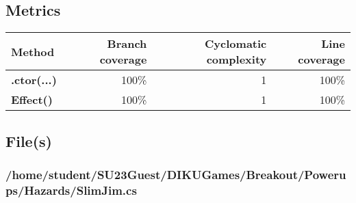 \documentclass[a4paper,landscape,10pt]{article}
\begin{document}
\subsection{Metrics}
\begin{longtable}[l]{|l|r|r|r|}
\hline
\textbf{Method} & \textbf{Branch coverage} & \textbf{Cyclomatic complexity} & \textbf{Line coverage}\\
\hline
\textbf{.ctor(...)} & 100\% & 1 & 100\%\\
\hline
\textbf{Effect()} & 100\% & 1 & 100\%\\
\hline
\end{longtable}
\subsection{File(s)}
\subsubsection{/home/student/SU23Guest/DIKUGames/Breakout/Powerups/Hazards/SlimJim.cs}
\end{document}
